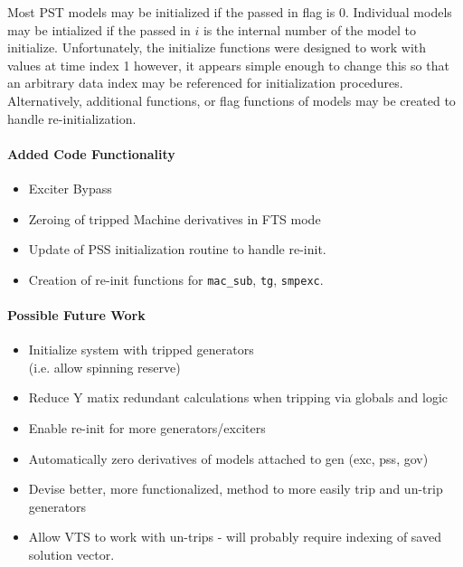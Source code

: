 \documentclass[12pt]{article}
\begin{document}
Most PST models may be initialized if the passed in flag is 0.
Individual models may be intialized if the passed in $i$ is the internal number of the model to initialize.
Unfortunately, the initialize functions were designed to work with values at time index 1 however, it appears simple enough to change this so that an arbitrary data index may be referenced for initialization procedures.
Alternatively, additional functions, or flag functions of models may be created to handle re-initialization.\\


\begin{minipage}[t]{0.47\linewidth}
\raggedright
\footnotesize
\paragraph{Added Code Functionality}
\begin{itemize}
 em
\item Exciter Bypass
\item Zeroing of tripped Machine derivatives in FTS mode
\item Update of PSS initialization routine to handle re-init.
\item Creation of re-init functions for \verb|mac_sub|, \verb|tg|, \verb|smpexc|.
\end{itemize}
\vfill \null
\end{minipage}%
\begin{minipage}[t]{0.47\linewidth}
\raggedright
\footnotesize
\paragraph{Possible Future Work}
\begin{itemize}
 em
\item Initialize system with tripped generators\\ (i.e. allow spinning reserve)
\item Reduce Y matix redundant calculations when tripping via globals and logic
\item Enable re-init for more generators/exciters
\item Automatically zero derivatives of models attached to gen (exc, pss, gov)
\item Devise better, more functionalized, method to more easily trip and un-trip generators 
\item Allow VTS to work with un-trips - will probably require indexing of saved solution vector.
\end{itemize}
\end{minipage}%
\end{document}
